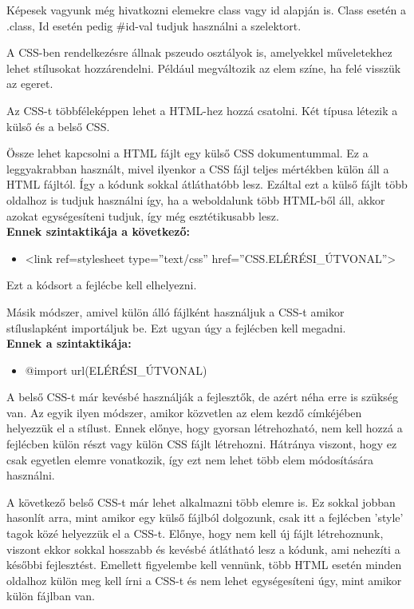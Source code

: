 Képesek vagyunk még hivatkozni elemekre class vagy id alapján is. Class esetén a .class, Id esetén pedig \#id-val tudjuk használni a szelektort.

A CSS-ben rendelkezésre állnak pszeudo osztályok is, amelyekkel műveletekhez lehet stílusokat hozzárendelni. Például megváltozik az elem színe, ha felé visszük az egeret.

Az CSS-t többféleképpen lehet a HTML-hez hozzá csatolni. Két típusa létezik a külső és a belső CSS.

Össze lehet kapcsolni a HTML fájlt egy külső CSS dokumentummal. Ez a leggyakrabban használt, mivel ilyenkor a CSS fájl teljes mértékben külön áll a HTML fájltól. Így a kódunk sokkal átláthatóbb lesz. Ezáltal ezt a külső fájlt több oldalhoz is tudjuk használni így, ha a weboldalunk több HTML-ből áll, akkor azokat egységesíteni tudjuk, így még esztétikusabb lesz.\\

\textbf{Ennek szintaktikája a következő:}
\begin{itemize}
    \item[]<link ref=stylesheet type=”text/css” href=”CSS.ELÉRÉSI\_ÚTVONAL”> 
\end{itemize}


Ezt a kódsort a fejlécbe kell elhelyezni.

Másik módszer, amivel külön álló fájlként használjuk a CSS-t amikor stíluslapként importáljuk be. Ezt ugyan úgy a fejlécben kell megadni.\\

\textbf{Ennek a szintaktikája:}
\begin{itemize}
    \item[]@import url(ELÉRÉSI\_ÚTVONAL) 
\end{itemize}


A belső CSS-t már kevésbé használják a fejlesztők, de azért néha erre is szükség van. Az egyik ilyen módszer, amikor közvetlen az elem kezdő címkéjében helyezzük el a stílust. Ennek előnye, hogy gyorsan létrehozható, nem kell hozzá a fejlécben külön részt vagy külön CSS fájlt létrehozni. Hátránya viszont, hogy ez csak egyetlen elemre vonatkozik, így ezt nem lehet több elem módosítására használni.

A következő belső CSS-t már lehet alkalmazni több elemre is. Ez sokkal jobban hasonlít arra, mint amikor egy külső fájlból dolgozunk, csak itt a fejlécben ’style’ tagok közé helyezzük el a CSS-t. Előnye, hogy nem kell új fájlt létrehoznunk, viszont ekkor sokkal hosszabb és kevésbé átlátható lesz a kódunk, ami nehezíti a későbbi fejlesztést. Emellett figyelembe kell vennünk, több HTML esetén minden oldalhoz külön meg kell írni a CSS-t és nem lehet egységesíteni úgy, mint amikor külön fájlban van.

